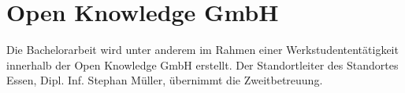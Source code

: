 





\section{Open Knowledge GmbH}


Die Bachelorarbeit wird unter anderem im Rahmen einer Werkstudententätigkeit innerhalb der Open Knowledge GmbH erstellt. Der Standortleiter des Standortes Essen, Dipl. Inf. Stephan Müller, übernimmt die Zweitbetreuung.

